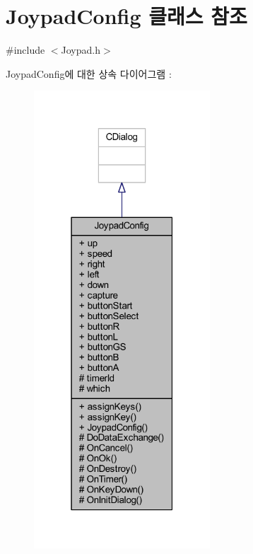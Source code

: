 \hypertarget{class_joypad_config}{}\section{Joypad\+Config 클래스 참조}
\label{class_joypad_config}


{\ttfamily \#include $<$Joypad.\+h$>$}



Joypad\+Config에 대한 상속 다이어그램 \+: \nopagebreak
\begin{figure}[H]
\begin{center}
\leavevmode
\includegraphics[width=187pt]{class_joypad_config__inherit__graph}
\end{center}
\end{figure}


